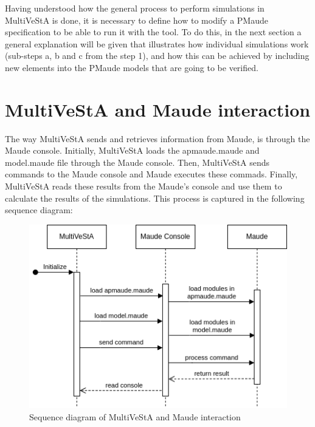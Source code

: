 Having understood how the general process to perform simulations in MultiVeStA is done, it is necessary to define how to modify a PMaude specification to be able to run it with the tool. To do this, in the next section a general explanation will be given that illustrates how individual simulations work (sub-steps a, b and c from the step 1), and how this can be achieved by including new elements into the PMaude models that are going to be verified.

\section{MultiVeStA and Maude interaction}
The way MultiVeStA sends and retrieves information from Maude, is through the Maude console. Initially, MultiVeStA loads the apmaude.maude and model.maude file through the Maude console. Then, MultiVeStA sends commands to the Maude console and Maude executes these commads. Finally, MultiVeStA reads these results from the Maude's console and use them to calculate the results of the simulations. This process is captured in the following sequence diagram:

\begin{figure}[H]
    \centering
    \includegraphics[scale = 0.6]{images/multi4.png}
    \caption{Sequence diagram of MultiVeStA and Maude interaction}
    \label{fig:multi4}
\end{figure}

